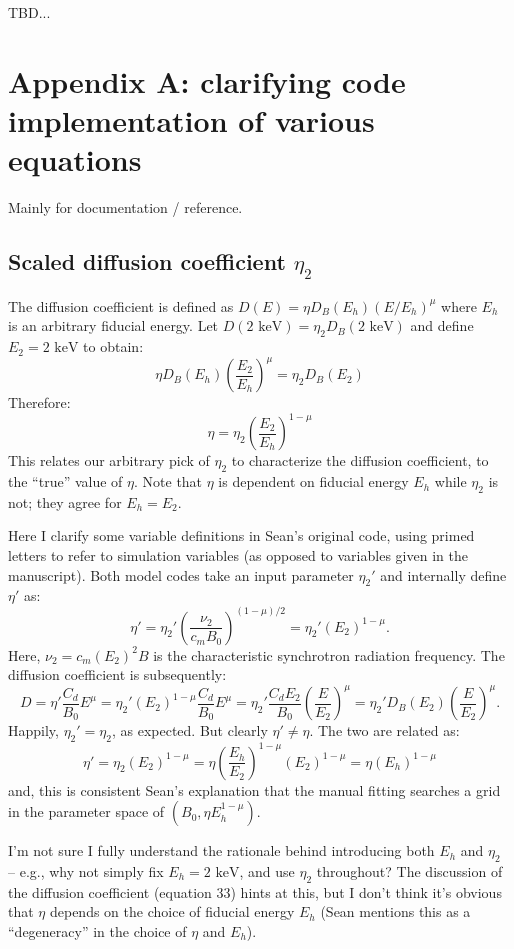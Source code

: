 \documentclass[10pt]{article}
\begin{document}
TBD...

\section*{Appendix A: clarifying code implementation of various equations}

Mainly for documentation / reference.

\subsection*{Scaled diffusion coefficient $\eta_2$}

The diffusion coefficient is defined as $D(E) = \eta D_B(E_h) (E/E_h)^\mu$
where $E_h$ is an arbitrary fiducial energy.
Let $D(\text{2 keV}) = \eta_2 D_B(\text{2 keV})$ and
define $E_2 = \text{2 keV}$ to obtain:
\[
  \eta D_B(E_h) \left(\frac{E_2}{E_h}\right)^\mu = \eta_2 D_B(E_2)
\]
Therefore:
\[
    \eta = \eta_2 \left(\frac{E_2}{E_h}\right)^{1 - \mu}
\]
This relates our arbitrary pick of $\eta_2$ to characterize the diffusion
coefficient, to the ``true'' value of $\eta$.  Note that $\eta$ is dependent on
fiducial energy $E_h$ while $\eta_2$ is not; they agree for $E_h = E_2$.

Here I clarify some variable definitions in Sean's original code, using
primed letters to refer to simulation variables (as opposed to variables given
in the manuscript).  Both model codes take an input parameter $\eta_2'$ and
internally define $\eta'$ as:
\[
  \eta' = \eta_2' \left( \frac{\nu_2}{c_m B_0} \right)^{(1-\mu)/2}
        = \eta_2' (E_2)^{1-\mu}\text{.}
\]
Here, $\nu_2 = c_m (E_2)^2 B$ is the characteristic synchrotron radiation
frequency.  The diffusion coefficient is subsequently:
\[
  D = \eta' \frac{C_d}{B_0} E^\mu
    = \eta_2' (E_2)^{1-\mu} \frac{C_d}{B_0} E^\mu
    = \eta_2' \frac{C_d E_2}{B_0} \left(\frac{E}{E_2}\right)^\mu
    = \eta_2' D_B\left(E_2\right) \left(\frac{E}{E_2}\right)^\mu\text{.}
\]
Happily, $\eta_2' = \eta_2$, as expected.  But clearly $\eta' \neq \eta$.
The two are related as:
\[
  \eta' = \eta_2 (E_2)^{1-\mu}
        = \eta \left(\frac{E_h}{E_2}\right)^{1 - \mu} (E_2)^{1-\mu}
        = \eta (E_h)^{1-\mu}
\]
and, this is consistent Sean's explanation that the manual fitting searches a
grid in the parameter space of $(B_0, \eta E_h^{1-\mu})$.

I'm not sure I fully understand the rationale behind introducing both $E_h$ and
$\eta_2$ -- e.g., why not simply fix $E_h = \text{2 keV}$, and use $\eta_2$
throughout?  The discussion of the diffusion coefficient (equation 33) hints at
this, but I don't think it's obvious that $\eta$ depends on the choice of
fiducial energy $E_h$ (Sean mentions this as a ``degeneracy'' in the choice of
$\eta$ and $E_h$).
\end{document}

